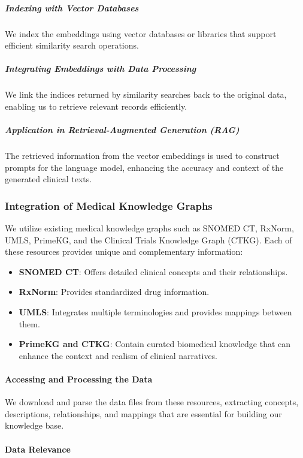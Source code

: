 \documentclass[12pt, a4paper]{article}
\begin{document}
\subparagraph{Indexing with Vector Databases}

We index the embeddings using vector databases or libraries that support efficient similarity search operations.

\subparagraph{Integrating Embeddings with Data Processing}

We link the indices returned by similarity searches back to the original data, enabling us to retrieve relevant records efficiently.

\subparagraph{Application in Retrieval-Augmented Generation (RAG)}

The retrieved information from the vector embeddings is used to construct prompts for the language model, enhancing the accuracy and context of the generated clinical texts.

\subsubsection{Integration of Medical Knowledge Graphs}

We utilize existing medical knowledge graphs such as SNOMED CT, RxNorm, UMLS, PrimeKG, and the Clinical Trials Knowledge Graph (CTKG). Each of these resources provides unique and complementary information:

\begin{itemize}
    \item \textbf{SNOMED CT}: Offers detailed clinical concepts and their relationships.
    \item \textbf{RxNorm}: Provides standardized drug information.
    \item \textbf{UMLS}: Integrates multiple terminologies and provides mappings between them.
    \item \textbf{PrimeKG and CTKG}: Contain curated biomedical knowledge that can enhance the context and realism of clinical narratives.
\end{itemize}

\paragraph{Accessing and Processing the Data}

We download and parse the data files from these resources, extracting concepts, descriptions, relationships, and mappings that are essential for building our knowledge base.

\paragraph{Data Relevance}
\end{document}
